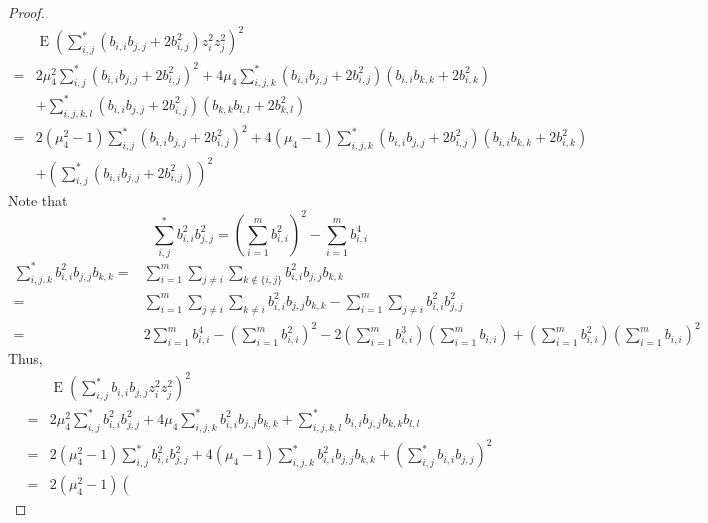\documentclass[11pt]{article}
\DeclareMathOperator{\myE}{E}
\theoremstyle{plain}
\theoremstyle{definition}
\theoremstyle{remark}
\begin{document}
\begin{proof}
\begin{equation*}
\begin{split}
        & \myE (\sum_{i,j}^* (b_{i,i} b_{j,j}+2b_{i,j}^2) z_i^2 z_j^2)^2
    \\
    =&
    2\mu_4^2 \sum_{i,j}^* (b_{i,i} b_{j,j} + 2b_{i,j}^2 )^2
    +
    4\mu_4 \sum_{i,j,k}^*
    (b_{i,i} b_{j,j} +2b_{i,j}^2)
    (b_{i,i} b_{k,k} +2b_{i,k}^2)
    \\
    &+\sum_{i,j,k,l}^* 
    (b_{i,i} b_{j,j} +2b_{i,j}^2)
    (b_{k,k} b_{l,l} +2b_{k,l}^2)
    \\
    =&
    2(\mu_4^2-1) \sum_{i,j}^* (b_{i,i} b_{j,j} + 2b_{i,j}^2 )^2
    +
    4(\mu_4-1) \sum_{i,j,k}^*
    (b_{i,i} b_{j,j} +2b_{i,j}^2)
    (b_{i,i} b_{k,k} +2b_{i,k}^2)
    \\
    &+
(\sum_{i,j}^* (b_{i,i} b_{j,j}+2b_{i,j}^2) )^2
    \end{split}
\end{equation*}
Note that
\begin{equation*}
    \sum_{i,j}^* b_{i,i}^2 b_{j,j}^2
    =
    \left(
        \sum_{i=1}^m b_{i,i}^2 
    \right)^2- \sum_{i=1}^m b_{i,i}^4
\end{equation*}
\begin{equation*}
    \begin{split}
    \sum_{i,j,k}^* b_{i,i}^2 b_{j,j} b_{k,k}
    =&
    \sum_{i=1}^m
    \sum_{j\neq i}
    \sum_{k\notin \{i,j\}}
    b_{i,i}^2 b_{j,j} b_{k,k}
    \\
    =&
    \sum_{i=1}^m
    \sum_{j\neq i}
    \sum_{k\neq i}
    b_{i,i}^2 b_{j,j} b_{k,k}
    -
    \sum_{i=1}^m
    \sum_{j\neq i}
    b_{i,i}^2 b_{j,j}^2
    \\
    =&
    2\sum_{i=1}^m b_{i,i}^4
    -
    (\sum_{i=1}^m b_{i,i}^2)^2
    -
    2
    (\sum_{i=1}^m b_{i,i}^3)
    (\sum_{i=1}^m b_{i,i})
    +
    (\sum_{i=1}^m b_{i,i}^2)
    (\sum_{i=1}^m b_{i,i})^2
    \end{split}
\end{equation*}
Thus,
\begin{equation*}
    \begin{split}
        & \myE (\sum_{i,j}^* b_{i,i} b_{j,j} z_i^2 z_j^2)^2
    \\
    =&
    2\mu_4^2 \sum_{i,j}^* b_{i,i}^2 b_{j,j}^2
    +
    4\mu_4 \sum_{i,j,k}^* b_{i,i}^2 b_{j,j} b_{k,k}
    +\sum_{i,j,k,l}^* b_{i,i} b_{j,j} b_{k,k} b_{l,l}
    \\
    =&
    2(\mu_4^2-1) \sum_{i,j}^* b_{i,i}^2 b_{j,j}^2
    +
    4(\mu_4-1) \sum_{i,j,k}^* b_{i,i}^2 b_{j,j} b_{k,k}
    +(\sum_{i,j}^* b_{i,i} b_{j,j})^2
    \\
    =&
    2(\mu_4^2-1)\left(

\end{split}
\end{equation*}
\end{proof}
\end{document}
